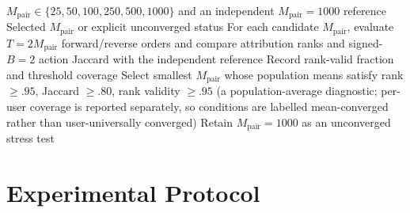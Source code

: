 \documentclass[a4paper,fleqn,doubleblind]{cas-sc}
\begin{document}
\begin{algorithm}[t]
\caption{Independent convergence selection}
\label{alg:convergence}
\begin{algorithmic}[1]
\Require $M_{\mathrm{pair}}\in\{25,50,100,250,500,1000\}$ and an independent $M_{\mathrm{pair}}=1000$ reference
\Ensure Selected $M_{\mathrm{pair}}$ or explicit unconverged status
\State For each candidate $M_{\mathrm{pair}}$, evaluate $T=2M_{\mathrm{pair}}$ forward/reverse orders and compare attribution ranks and signed-$B=2$ action Jaccard with the independent reference
\State Record rank-valid fraction and threshold coverage
\EndFor
\State Select smallest $M_{\mathrm{pair}}$ whose population means satisfy rank $\ge.95$, Jaccard $\ge.80$, rank validity $\ge.95$ (a population-average diagnostic; per-user coverage is reported separately, so conditions are labelled mean-converged rather than user-universally converged)
\State Retain $M_{\mathrm{pair}}=1000$ as an unconverged stress test\EndIf
\end{algorithmic}
\end{algorithm}

\section{Experimental Protocol}
\end{document}
